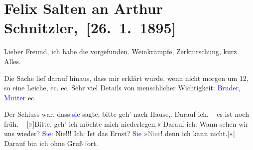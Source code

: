 

\renewcommand{\erwaehntePersonen}{Personen: Adele Sandrock, Christian Sandrock, Johanna Simonetta Sandrock}
\renewcommand{\erwaehnteInstitutionen}{Institutionen: Oseh Chesed (Humanitas)}
\renewcommand{\erwaehnteOrte}{Orte: Hörlgasse, Wien}
\renewcommand{\erwaehnteWerke}{Werke: Tagebuch}
\section[ Felix Salten an Arthur Schnitzler, {[}26. 1. 1895{]}]{Felix Salten an Arthur Schnitzler, {[}26. 1. 1895{]}}
\nopagebreak{}
\rehead{ }\normalsize\beginnumbering{}
\toendnotes[C]{\smallbreak\pagebreak[2]}
\toendnotes[C]{\smallbreak}
\pstart
           \noindent{}{\pb}Lieber Freund, ich habe die \label{K_L03149-1v}\label{K_L03149-1h} vorgefunden.
               Weinkrämpfe, Zerknirschung, kurz Alles.\pend
           
\pstart
           Die Sache lief darauf hinaus, dass mir erklärt wurde, wenn nicht morgen um 12, so  eine Leiche, ec. ec. Sehr viel Details von menschlicher Wichtigkeit:
                  \textcolor{blue}{Bruder}{}\ledrightnote{{$\rightarrow$}\textcolor{blue}{Christian Sandrock}}, \textcolor{blue}{Mutter}{}\ledrightnote{{$\rightarrow$}\textcolor{blue}{Johanna Simonetta Sandrock}} ec.\pend
           
\pstart
           Der Schluss war, dass \textcolor{blue}{sie}{}\ledrightnote{{$\rightarrow$}\textcolor{blue}{Adele Sandrock}}
               sagte, bitte geh’ nach Hause,. Darauf ich, – es ist noch früh. –
                  {[}»{]}Bitte, geh’ ich möchte mich niederlegen.« Darauf ich: Wann
               sehen wir uns wieder? \textcolor{blue}{Sie}{}\ledrightnote{{$\rightarrow$}\textcolor{blue}{Adele Sandrock}}:
               Nie!!! Ich: Ist das Ernst? \textcolor{blue}{Sie}{}\ledrightnote{{$\rightarrow$}\textcolor{blue}{Adele Sandrock}} »\textcolor{gray}{Ni{\geminationm}er}! {\pb}denn ich kann
                  nicht.{[}«{]} Darauf bin ich ohne Gruß \textcolor{gray}{f}ort.\pend
           

